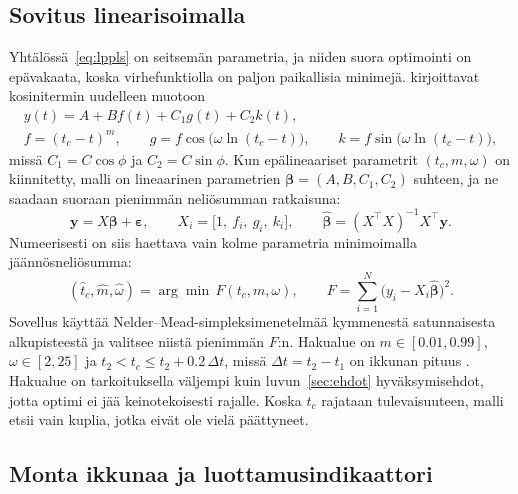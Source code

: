 \documentclass[10pt,a4paper]{article}
\newcommand{\tc}{t_c}
\begin{document}
\subsection{Sovitus linearisoimalla}

Yhtälössä~\eqref{eq:lppls} on seitsemän parametria, ja niiden suora optimointi on epävakaata,
koska virhefunktiolla on paljon paikallisia minimejä. \citet{filimonov2013} kirjoittavat
kosinitermin uudelleen muotoon
\begin{equation}\label{eq:linear}
  \begin{gathered}
  y(t) = A + B f(t) + C_1 g(t) + C_2 k(t),\\
  f=(\tc-t)^m,\qquad g=f\cos\bigl(\omega\ln(\tc-t)\bigr),\qquad k=f\sin\bigl(\omega\ln(\tc-t)\bigr),
  \end{gathered}
\end{equation}
missä $C_1 = C\cos\phi$ ja $C_2 = C\sin\phi$. Kun epälineaariset parametrit $(\tc, m, \omega)$
on kiinnitetty, malli on lineaarinen parametrien $\bm{\beta} = (A, B, C_1, C_2)$ suhteen, ja
ne saadaan suoraan pienimmän neliösumman ratkaisuna:
\begin{equation}\label{eq:ols}
  \mathbf{y} = X\bm{\beta} + \bm{\varepsilon},\qquad
  X_i = \bigl[1,\ f_i,\ g_i,\ k_i\bigr],\qquad
  \hat{\bm{\beta}} = (X^{\top}X)^{-1}X^{\top}\mathbf{y}.
\end{equation}
Numeerisesti on siis haettava vain kolme parametria minimoimalla jäännösneliösumma:
\begin{equation}\label{eq:argmin}
  (\hat t_c,\hat m,\hat\omega) = \arg\min\, F(\tc,m,\omega),\qquad
  F = \sum_{i=1}^{N}\bigl(y_i - X_i\hat{\bm{\beta}}\bigr)^2 .
\end{equation}
Sovellus käyttää Nelder--Mead-simpleksimenetelmää \citep{nelder1965} kymmenestä satunnaisesta
alkupisteestä ja valitsee niistä pienimmän $F$:n. Hakualue on $m\in[0.01, 0.99]$,
$\omega\in[2, 25]$ ja $t_2 < \tc \le t_2 + 0.2\,\Delta t$, missä $\Delta t = t_2 - t_1$ on
ikkunan pituus \citep{zhang2016}. Hakualue on tarkoituksella väljempi kuin
luvun~\ref{sec:ehdot} hyväksymisehdot, jotta optimi ei jää keinotekoisesti rajalle. Koska $\tc$
rajataan tulevaisuuteen, malli etsii vain kuplia, jotka eivät ole vielä päättyneet.

\subsection{Monta ikkunaa ja luottamusindikaattori}
\end{document}
